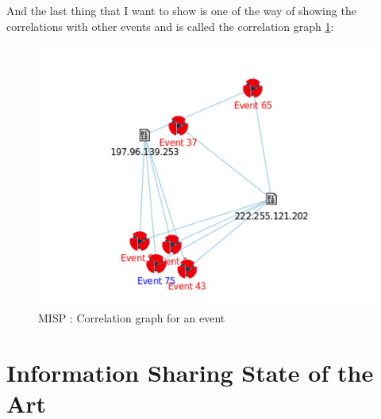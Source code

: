 \documentclass{eplmastersthesis}
\begin{document}
And the last thing that I want to show is one of the way of showing the correlations with other events and is called the correlation graph \ref{webcorrelation}:
\begin{figure}[!h]
	\begin{center}
		\includegraphics[scale=0.35]{res/webCorrelationGraph}
		\caption{MISP : Correlation graph for an event}
		\label{webcorrelation}
	\end{center}
\end{figure}



\section{Information Sharing State of the Art}
\end{document}
